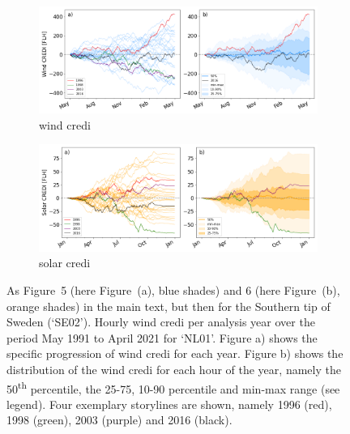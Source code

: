 \documentclass[a4paper,11pt]{extarticle}
\newcommand{\ts}[1]{\textsuperscript{#1}}
\newcommand{\sdi}[0]{{\sc solar credi}}
\newcommand{\wdi}[0]{{\sc wind credi}}
\begin{document}
\begin{figure}[hb]
    \centering
    \begin{subfigure}[t]{\linewidth}
        \centering
        \includegraphics[width=\textwidth]{WindCREDI_annual_SE02}
        \caption{\wdi{}}\vspace*{0.5cm}
    \end{subfigure}
    
    \begin{subfigure}[t]{\linewidth}
        \centering
        \includegraphics[width=\textwidth]{SolarCREDI_annual_SE02}
        \caption{\sdi{}}\vspace*{0.5cm}
    \end{subfigure}
    \caption{
        As Figure~5 (here Figure~(a), blue shades) and 6 (here Figure~(b), orange shades) in the main text, but then for the Southern tip of Sweden (`SE02').
        Hourly \wdi{} per analysis year over the period May 1991 to April 2021 for `NL01'. 
        Figure a) shows the specific progression of \wdi{} for each year. 
        Figure b) shows the distribution of the \wdi{} for each hour of the year, namely the 50\ts{th} percentile, the 25-75, 10-90 percentile and min-max range (see legend). 
        Four exemplary storylines are shown, namely 1996 (red), 1998 (green), 2003 (purple) and 2016 (black).
    }
    \label{SIfig:analysis_seasonal_wind_other-regions}
\end{figure}
\end{document}
